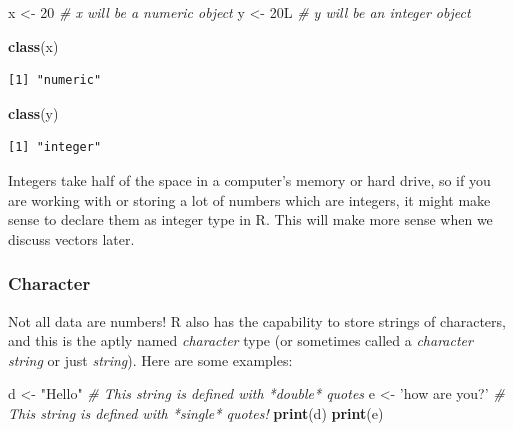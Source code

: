 \documentclass[
]{article}
\newenvironment{Shaded}{\begin{snugshade}}{\end{snugshade}}
\newcommand{\CommentTok}[1]{\textcolor[rgb]{0.56,0.35,0.01}{\textit{#1}}}
\newcommand{\DecValTok}[1]{\textcolor[rgb]{0.00,0.00,0.81}{#1}}
\newcommand{\KeywordTok}[1]{\textcolor[rgb]{0.13,0.29,0.53}{\textbf{#1}}}
\newcommand{\NormalTok}[1]{#1}
\newcommand{\StringTok}[1]{\textcolor[rgb]{0.31,0.60,0.02}{#1}}
\begin{document}
\begin{Shaded}
\begin{Highlighting}[]
\NormalTok{x <-}\StringTok{ }\DecValTok{20}   \CommentTok{# x will be a numeric object}
\NormalTok{y <-}\StringTok{ }\NormalTok{20L  }\CommentTok{# y will be an integer object}
\end{Highlighting}
\end{Shaded}

\begin{Shaded}
\begin{Highlighting}[]
\KeywordTok{class}\NormalTok{(x)}
\end{Highlighting}
\end{Shaded}

\begin{verbatim}
[1] "numeric"
\end{verbatim}

\begin{Shaded}
\begin{Highlighting}[]
\KeywordTok{class}\NormalTok{(y)}
\end{Highlighting}
\end{Shaded}

\begin{verbatim}
[1] "integer"
\end{verbatim}

Integers take half of the space in a computer's memory or hard drive, so if you are working with or storing a lot of numbers which are integers, it might make sense to declare them as integer type in R.
This will make more sense when we discuss vectors later.

\hypertarget{character}{%
\subsubsection{Character}\label{character}}

Not all data are numbers!
R also has the capability to store strings of characters, and this is the aptly named \emph{character} type (or sometimes called a \emph{character string} or just \emph{string}).
Here are some examples:

\begin{Shaded}
\begin{Highlighting}[]
\NormalTok{d <-}\StringTok{ "Hello"}         \CommentTok{# This string is defined with   *double*   quotes }
\NormalTok{e <-}\StringTok{ 'how are you?'}  \CommentTok{# This string is defined with   *single*   quotes!}
\KeywordTok{print}\NormalTok{(d)}
\KeywordTok{print}\NormalTok{(e)}
\end{Highlighting}
\end{Shaded}
\end{document}
